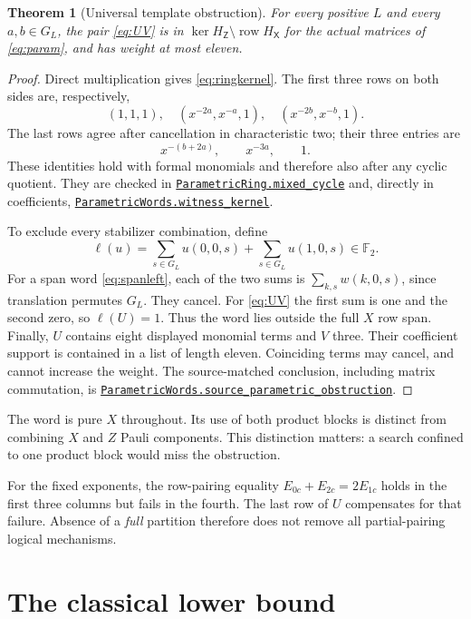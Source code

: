 \documentclass[11pt]{article}
\makeatletter
\newtheorem{theorem}{Theorem}[section]
\theoremstyle{definition}\newtheorem{definition}[theorem]{Definition}
\newcommand{\F}{\mathbb F_2}
\newcommand{\row}{\operatorname{row}}
\newcommand{\HX}{H_{\mathsf X}}
\newcommand{\HZ}{H_{\mathsf Z}}
\newcommand{\proofcommit}{98eb91cd9049e6a88887a5ba79150ad96a4a3e53}
\newcommand{\proofbase}{https://github.com/alectionary/vibe-math/blob/\proofcommit/formalization/distance-preservation}
\newcommand{\lean}[2]{\href{\proofbase/#1.lean\#L\csname leanline@#2\endcsname}{\nolinkurl{#2}}}
\makeatother
\begin{document}
\begin{theorem}[Universal template obstruction]\label{thm:template}
For every positive $L$ and every $a,b\in G_L$, the pair \eqref{eq:UV}
is in $\ker\HZ\setminus\row\HX$ for the actual matrices of
\eqref{eq:param}, and has weight at most eleven.
\end{theorem}
\begin{proof}
Direct multiplication gives \eqref{eq:ringkernel}. The first three
rows on both sides are, respectively,
\[
 (1,1,1),\quad (x^{-2a},x^{-a},1),\quad(x^{-2b},x^{-b},1).
\]
The last rows agree after cancellation in characteristic two; their
three entries are
\[
 x^{-(b+2a)},\qquad x^{-3a},\qquad 1.
\]
These identities hold with formal monomials and therefore also after
any cyclic quotient. They are checked in
\lean{ParametricRing}{ParametricRing.mixed_cycle} and, directly in
coefficients, \lean{ParametricWords}{ParametricWords.witness_kernel}.

To exclude every stabilizer combination, define
\begin{equation}\label{eq:ell}
 \ell(u)=\sum_{s\in G_L}u(0,0,s)+\sum_{s\in G_L}u(1,0,s)\in\F.
\end{equation}
For a span word \eqref{eq:spanleft}, each of the two sums is
$\sum_{k,s}w(k,0,s)$, since translation permutes $G_L$. They cancel.
For \eqref{eq:UV} the first sum is one and the second zero, so
$\ell(U)=1$. Thus the word lies outside the full $X$ row span.
Finally, $U$ contains eight displayed monomial terms and $V$ three.
Their coefficient support is contained in a list of length eleven.
Coinciding terms may cancel, and cannot increase the weight. The
source-matched conclusion, including matrix commutation, is
\lean{ParametricSource}{ParametricWords.source_parametric_obstruction}.
\end{proof}

The word is pure $X$ throughout. Its use of both product blocks is
distinct from combining $X$ and $Z$ Pauli components. This distinction
matters: a search confined to one product block would miss the obstruction.

For the fixed exponents, the row-pairing equality
$E_{0c}+E_{2c}=2E_{1c}$ holds in the first three columns but fails in the
fourth. The last row of $U$ compensates for that failure. Absence of a
\emph{full} partition therefore does not remove all partial-pairing
logical mechanisms.

\section{The classical lower bound}\label{sec:classical}
\end{document}
